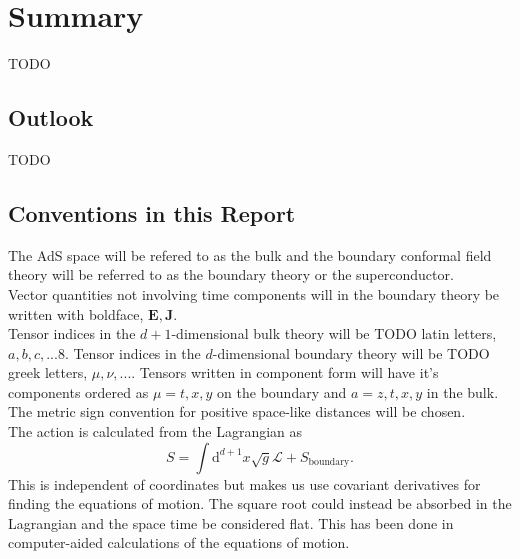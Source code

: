 \documentclass[12pt]{report}
\renewcommand{\d}{\ensuremath{\mathrm{d}}}
\renewcommand{\L}{\ensuremath{\mathcal{L}}}
\begin{document}
\chapter{Summary}
TODO
\section{Outlook}
TODO
\begin{appendices}
\section{Conventions in this Report\label{conventions}}
The AdS space will be refered to as the bulk and the boundary conformal field theory will be referred to as the boundary theory or the superconductor.\\
Vector quantities not involving time components will in the boundary theory be written with boldface, $\mathbf{E}, \mathbf{J}$.\\
Tensor indices in the $d+1$-dimensional bulk theory will be TODO latin letters, $a,b,c,...8$. Tensor indices in the $d$-dimensional boundary theory will be TODO greek letters, $\mu,\nu,...$. Tensors written in component form will have it's components ordered as $\mu=t,x,y$ on the boundary and $a=z,t,x,y$ in the bulk.
The metric sign convention for positive space-like distances will be chosen.\\
The action is calculated from the Lagrangian as
\begin{equation}
 S=\int\d^{d+1} x\sqrt{g}\L+S_\mathrm{boundary}.
\end{equation}
This is independent of coordinates but makes us use covariant derivatives for finding the equations of motion. The square root could instead be absorbed in the Lagrangian and the space time be considered flat. This has been done in computer-aided calculations of the equations of motion.

\end{appendices}
\end{document}
